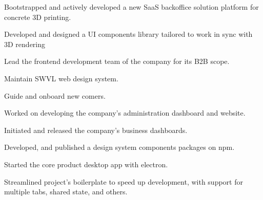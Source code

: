 \documentclass[]{deedy-resume-openfont}
\begin{document}
\begin{minipage}[t]{0.63\textwidth}
\begin{tightemize}
\end{tightemize}
\sectionsep
\vspace{4pt}

\subsectionsep{}
\begin{tightemize}
\item Bootstrapped and actively developed a new SaaS backoffice solution platform for concrete 3D printing.
\item Developed and designed a UI components library tailored to work in sync with 3D rendering
\end{tightemize}
\sectionsep
\vspace{4pt}
\subsectionsep{}
\begin{tightemize}
\item Lead the frontend development team of the company for its B2B scope.
\item Maintain SWVL web design system.
\item Guide and onboard new comers.
\end{tightemize}
\sectionsep
\vspace{4pt}

\subsectionsep{}
\begin{tightemize}
\item Worked on developing the company's administration dashboard and website.
\item Initiated and released the company's business dashboards.
\item Developed, and published a design system components packages on npm.
\end{tightemize}
\sectionsep
\vspace{4pt}

\subsectionsep{}
\begin{tightemize}
\item Started the core product desktop app with electron.
\item Streamlined project's boilerplate to speed up development, with support for multiple tabs, shared state, and others.
\end{tightemize}
\sectionsep
\vspace{4pt}


\end{minipage}
\end{document}
